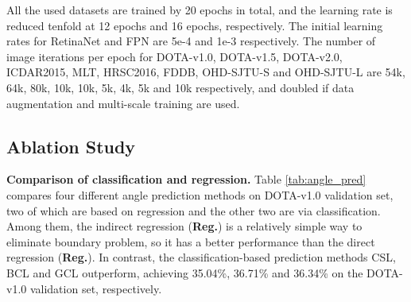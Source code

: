 \documentclass[10pt,journal,compsoc]{IEEEtran}
\begin{document}
All the used datasets are trained by 20 epochs in total, and the learning rate is reduced tenfold at 12 epochs and 16 epochs, respectively. The initial learning rates for RetinaNet and FPN are 5e-4 and 1e-3 respectively. The number of image iterations per epoch for DOTA-v1.0, DOTA-v1.5, DOTA-v2.0, ICDAR2015, MLT, HRSC2016, FDDB, OHD-SJTU-S and OHD-SJTU-L are 54k, 64k, 80k, 10k, 10k, 5k, 4k, 5k and 10k respectively, and doubled if data augmentation and multi-scale training are used. 

\subsection{Ablation Study}\label{sec:ablation_study}
\noindent \textbf{Comparison of classification and regression.}
Table \ref{tab:angle_pred} compares four different angle prediction methods on DOTA-v1.0 validation set, two of which are based on regression and the other two are via classification. Among them, the indirect regression (\textbf{Reg.}) is a relatively simple way to eliminate boundary problem, so it has a better performance than the direct regression (\textbf{Reg.}). In contrast, the classification-based prediction methods CSL, BCL and GCL outperform, achieving 35.04\%, 36.71\% and 36.34\% on the DOTA-v1.0 validation set, respectively.
\end{document}

